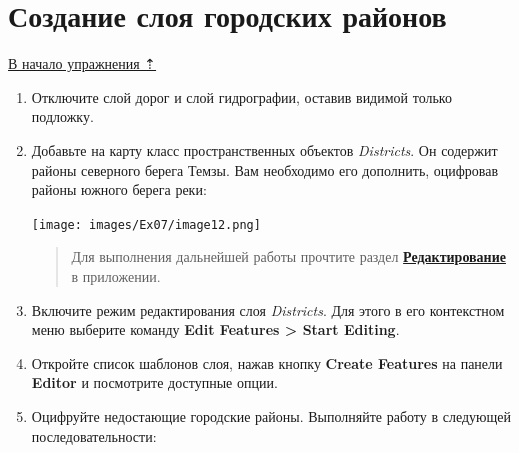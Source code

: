 \documentclass[12pt,]{book}
\begin{document}
\hypertarget{map-ref-economic-regions}{%
\section{Создание слоя городских районов}\label{map-ref-economic-regions}}

\protect\hyperlink{map-ref-economic}{В начало упражнения ⇡}

\begin{enumerate}
\def\labelenumi{\arabic{enumi}.}
\item
  Отключите слой дорог и слой гидрографии, оставив видимой только подложку.
\item
  Добавьте на карту класс пространственных объектов \emph{Districts}. Он содержит районы северного берега Темзы. Вам необходимо его дополнить, оцифровав районы южного берега реки:

  \texttt{[image: images/Ex07/image12.png]}

  \begin{quote}
  Для выполнения дальнейшей работы прочтите раздел \textbf{\protect\hyperlink{manual-edit}{Редактирование}} в приложении.
  \end{quote}
\item
  Включите режим редактирования слоя \emph{Districts}. Для этого в его контекстном меню выберите команду \textbf{Edit Features \textgreater{} Start Editing}.
\item
  Откройте список шаблонов слоя, нажав кнопку \textbf{Create Features} на панели \textbf{Editor} и посмотрите доступные опции.
\item
  Оцифруйте недостающие городские районы. Выполняйте работу в следующей последовательности:


\end{enumerate}
\end{document}
